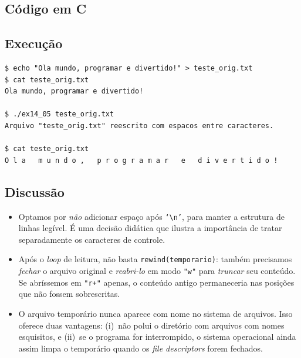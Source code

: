 \documentclass[11pt,a4paper]{article}
\begin{document}
\subsection*{C\'odigo em C}



\subsection*{Execu\c{c}\~ao}

\begin{saidabox}
\begin{lstlisting}[style=terminal]
$ echo "Ola mundo, programar e divertido!" > teste_orig.txt
$ cat teste_orig.txt
Ola mundo, programar e divertido!

$ ./ex14_05 teste_orig.txt
Arquivo "teste_orig.txt" reescrito com espacos entre caracteres.

$ cat teste_orig.txt
O l a   m u n d o ,   p r o g r a m a r   e   d i v e r t i d o !
\end{lstlisting}
\end{saidabox}

\subsection*{Discuss\~ao}

\begin{itemize}[leftmargin=*]
  \item Optamos por \emph{n\~ao} adicionar espa\c{c}o ap\'os \texttt{`\textbackslash n'}, para manter a estrutura de linhas leg\'ivel. \'E uma decis\~ao did\'atica que ilustra a import\^ancia de tratar separadamente os caracteres de controle.
  \item Ap\'os o \emph{loop} de leitura, n\~ao basta \texttt{rewind(temporario)}: tamb\'em precisamos \emph{fechar} o arquivo original e \emph{reabri-lo} em modo \texttt{"w"} para \emph{truncar} seu conte\'udo. Se abr\'issemos em \texttt{"r+"} apenas, o conte\'udo antigo permaneceria nas posi\c{c}\~oes que n\~ao fossem sobrescritas.
  \item O arquivo tempor\'ario nunca aparece com nome no sistema de arquivos. Isso oferece duas vantagens: (i)~n\~ao polui o diret\'orio com arquivos com nomes esquisitos, e (ii)~se o programa for interrompido, o sistema operacional ainda assim limpa o tempor\'ario quando os \emph{file descriptors} forem fechados.
\end{itemize}
\end{document}
